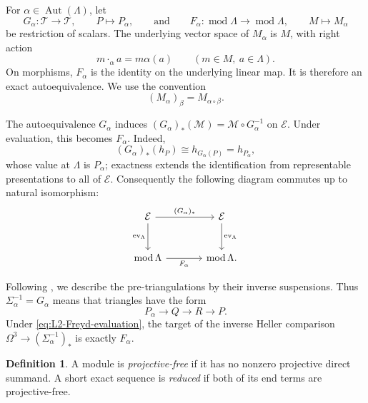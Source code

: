 \documentclass[a4paper,11pt,reqno]{amsart}
\theoremstyle{definition}
\newtheorem{definition}[definition]{Definition}
\theoremstyle{plain}
\numberwithin{equation}{section}
\newcommand{\T}{\mathcal T}
\begin{document}
For \(\alpha\in\operatorname{Aut}(\Lambda)\), let
\[
 G_\alpha:\T\longrightarrow\T,
 \qquad P\longmapsto P_\alpha,
 \qquad\text{and}\qquad
 F_\alpha:\operatorname{mod}\Lambda\longrightarrow
 \operatorname{mod}\Lambda,
 \qquad M\longmapsto M_\alpha
\]
be restriction of scalars.  The underlying vector space of \(M_\alpha\)
is \(M\), with right action
\begin{equation}
\label{eq:L2-module-twist}
 m\mathbin{\cdot_\alpha}a=m\alpha(a)
 \qquad(m\in M,\ a\in\Lambda).
\end{equation}
On morphisms, \(F_\alpha\) is the identity on the underlying linear map.
It is therefore an exact autoequivalence.  We use the convention
\begin{equation}
\label{eq:L2-twist-composition}
 (M_\alpha)_\beta=M_{\alpha\circ\beta}.
\end{equation}

The autoequivalence \(G_\alpha\) induces
\((G_\alpha)_*(\mathcal M)=\mathcal M\circ G_\alpha^{-1}\) on
\(\mathcal E\).  Under evaluation, this becomes \(F_\alpha\).  Indeed,
\[
 (G_\alpha)_*(h_P)\cong h_{G_\alpha(P)}=h_{P_\alpha},
\]
whose value at \(\Lambda\) is \(P_\alpha\); exactness extends the
identification from representable presentations to all of \(\mathcal E\).
Consequently the following diagram commutes up to natural isomorphism:
\begin{equation}
\label{eq:L2-twist-evaluation-square}
\begin{tikzcd}[column sep=large,row sep=large]
\mathcal E\arrow[r,"(G_\alpha)_*"]
 \arrow[d,"\operatorname{ev}_\Lambda"']&
\mathcal E\arrow[d,"\operatorname{ev}_\Lambda"]\\
\operatorname{mod}\Lambda\arrow[r,"F_\alpha"']&
\operatorname{mod}\Lambda.
\end{tikzcd}
\end{equation}

Following \cite[Section~2]{DiazCabreraMuro2026}, we describe the
pre-triangulations by their inverse suspensions.  Thus
\(\Sigma_\alpha^{-1}=G_\alpha\) means that triangles have the form
\[
 P_\alpha\longrightarrow Q\longrightarrow R\longrightarrow P.
\]
Under \eqref{eq:L2-Freyd-evaluation}, the target of the inverse Heller
comparison
\(\Omega^3\to(\Sigma_\alpha^{-1})_*\) is exactly \(F_\alpha\).

\begin{definition}
\label{def:L2-reduced}
A module is \emph{projective-free} if it has no nonzero projective direct
summand.  A short exact sequence is \emph{reduced} if both of its end
terms are projective-free.
\end{definition}
\end{document}

